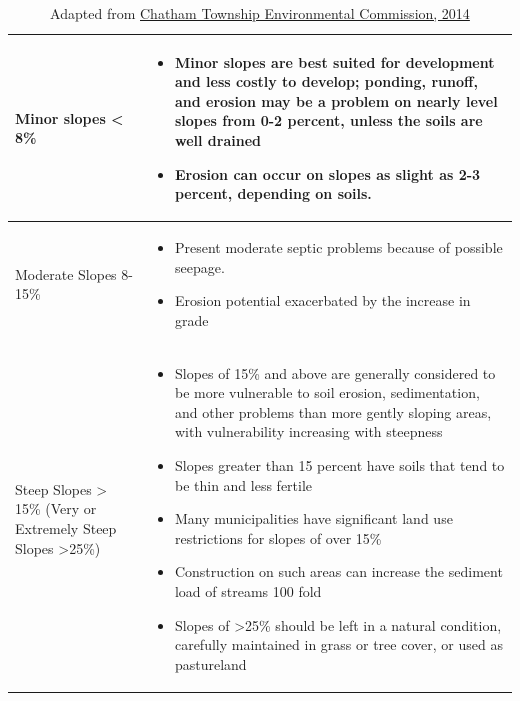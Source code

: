 \begin{table}
\begin{center}
\begin{tabular}{ | p{} p{}| } 
\hline
Minor slopes < 8\% &
    \begin{itemize}
    \item Minor slopes are best suited for development and less costly to 
    develop; ponding, runoff, and erosion may be a problem on nearly level 
    slopes from 0-2 percent, unless the soils are well drained
    \item Erosion can occur on slopes as slight as 2-3 percent, depending on
    soils.
    \end{itemize}
    \\
\hline
Moderate Slopes 8-15\% &
    \begin{itemize}
        \item Present moderate septic problems because of possible seepage.
        \item Erosion potential exacerbated by the increase in grade
    \end{itemize}
    \\
\hline
Steep Slopes > 15\% (Very or Extremely Steep Slopes >25\%) &
    \begin{itemize}
    \item Slopes of 15\% and above are generally considered to be more 
    vulnerable to soil erosion, sedimentation, and other problems than more 
    gently sloping areas, with vulnerability increasing with steepness
    \item Slopes greater than 15 percent have soils that tend to be thin and 
    less fertile
    \item Many municipalities have significant land use restrictions for slopes 
    of over 15\%
    \item Construction on such areas can increase the sediment load of streams 
    100 fold
    \item Slopes of  >25\% should be left in a natural condition, carefully 
    maintained in grass or tree cover, or used as pastureland
    \end{itemize}
    \\
\hline
\end{tabular}
\end{center}
\caption{Adapted from \href{http://www.chathamtownship-nj.gov/images/CTEC/NRI1999/slopesadd090704.pdf}{Chatham Township Environmental Commission, 2014}\label{tab:steep_slopes}}
\end{table}
